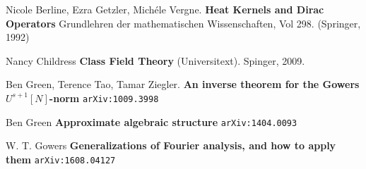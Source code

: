 \documentclass[12pt]{article}
\begin{document}
\begin{thebibliography}{}

\item Nicole Berline, Ezra Getzler, Mich\'{e}le Vergne. \textbf{Heat Kernels and Dirac Operators} Grundlehren der mathematischen Wissenschaften, Vol 298. (Springer, 1992)

\item Nancy Childress \textbf{Class Field Theory} (Universitext).  Spinger, 2009.

\item Ben Green, Terence Tao, Tamar Ziegler. \textbf{An inverse theorem for the Gowers $U^{s+1}[N]$-norm} \texttt{arXiv:1009.3998}

\item Ben Green \textbf{Approximate algebraic structure} \texttt{arXiv:1404.0093}

\item W. T. Gowers \textbf{Generalizations of Fourier analysis, and how to apply them} \texttt{arXiv:1608.04127}

\end{thebibliography}

\end{document}
